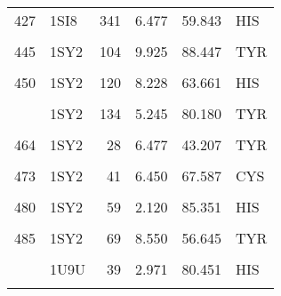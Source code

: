\begin{table}
\begin{tabular}{llrrrl}
			427 & 1SI8 & 341 & 6.477 & 59.843 & HIS\\
			\addlinespace
			\cellcolor{gray!6}{434} & \cellcolor{gray!6}{1SI8} & \cellcolor{gray!6}{54} & \cellcolor{gray!6}{4.940} & \cellcolor{gray!6}{26.890} & \cellcolor{gray!6}{HIS}\\
			445 & 1SY2 & 104 & 9.925 & 88.447 & TYR\\
			\cellcolor{gray!6}{446} & \cellcolor{gray!6}{1SY2} & \cellcolor{gray!6}{105} & \cellcolor{gray!6}{8.182} & \cellcolor{gray!6}{68.754} & \cellcolor{gray!6}{TYR}\\
			450 & 1SY2 & 120 & 8.228 & 63.661 & HIS\\
			\cellcolor{gray!6}{453} & \cellcolor{gray!6}{1SY2} & \cellcolor{gray!6}{124} & \cellcolor{gray!6}{7.544} & \cellcolor{gray!6}{61.698} & \cellcolor{gray!6}{HIS}\\
			\addlinespace
			457 & 1SY2 & 134 & 5.245 & 80.180 & TYR\\
			\cellcolor{gray!6}{461} & \cellcolor{gray!6}{1SY2} & \cellcolor{gray!6}{17} & \cellcolor{gray!6}{9.754} & \cellcolor{gray!6}{62.084} & \cellcolor{gray!6}{TYR}\\
			464 & 1SY2 & 28 & 6.477 & 43.207 & TYR\\
			\cellcolor{gray!6}{472} & \cellcolor{gray!6}{1SY2} & \cellcolor{gray!6}{40} & \cellcolor{gray!6}{5.181} & \cellcolor{gray!6}{30.456} & \cellcolor{gray!6}{TYR}\\
			473 & 1SY2 & 41 & 6.450 & 67.587 & CYS\\
			\addlinespace
			\cellcolor{gray!6}{479} & \cellcolor{gray!6}{1SY2} & \cellcolor{gray!6}{58} & \cellcolor{gray!6}{7.252} & \cellcolor{gray!6}{86.657} & \cellcolor{gray!6}{TYR}\\
			480 & 1SY2 & 59 & 2.120 & 85.351 & HIS\\
			\cellcolor{gray!6}{481} & \cellcolor{gray!6}{1SY2} & \cellcolor{gray!6}{60} & \cellcolor{gray!6}{8.111} & \cellcolor{gray!6}{80.724} & \cellcolor{gray!6}{TYR}\\
			485 & 1SY2 & 69 & 8.550 & 56.645 & TYR\\
			\cellcolor{gray!6}{497} & \cellcolor{gray!6}{1U9U} & \cellcolor{gray!6}{30} & \cellcolor{gray!6}{5.740} & \cellcolor{gray!6}{62.876} & \cellcolor{gray!6}{TYR}\\
			\addlinespace
			501 & 1U9U & 39 & 2.971 & 80.451 & HIS\\
			\cellcolor{gray!6}{512} & \cellcolor{gray!6}{1U9U} & \cellcolor{gray!6}{58} & \cellcolor{gray!6}{4.883} & \cellcolor{gray!6}{76.301} & \cellcolor{gray!6}{TYR}\\

\end{tabular}
\end{table}
